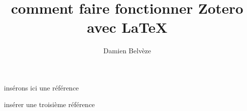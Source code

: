\documentclass[12pt]{article}
\title{comment faire fonctionner Zotero avec LaTeX}
\author{Damien Belvèze}
\begin{document}
\maketitle

insérons ici une référence \cite{claveyMastodonRefugePour2023}


insérer une troisième référence \cite{godefroidCommentCertifierCompte2024}

\printbibliography
\end{document}
